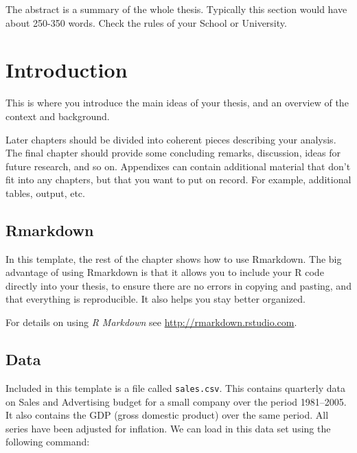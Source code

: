 \documentclass{sydneythesis}
\begin{document}
The abstract is a summary of the whole thesis. Typically this section would have about 250-350 words. Check the rules of your School or University.

\clearpage{}\setcounter{page}{0}

\hypertarget{ch:intro}{%
\chapter{Introduction}\label{ch:intro}}

This is where you introduce the main ideas of your thesis, and an overview of the context and background.

Later chapters should be divided into coherent pieces describing your analysis. The final chapter should provide some concluding remarks, discussion, ideas for future research, and so on. Appendixes can contain additional material that don't fit into any chapters, but that you want to put on record. For example, additional tables, output, etc.

\hypertarget{rmarkdown}{%
\section{Rmarkdown}\label{rmarkdown}}

In this template, the rest of the chapter shows how to use Rmarkdown. The big advantage of using Rmarkdown is that it allows you to include your R code directly into your thesis, to ensure there are no errors in copying and pasting, and that everything is reproducible. It also helps you stay better organized.

For details on using \emph{R Markdown} see \url{http://rmarkdown.rstudio.com}.

\hypertarget{data}{%
\section{Data}\label{data}}

Included in this template is a file called \texttt{sales.csv}. This contains quarterly data on Sales and Advertising budget for a small company over the period 1981--2005. It also contains the GDP (gross domestic product) over the same period. All series have been adjusted for inflation. We can load in this data set using the following command:

\begin{Shaded}
\begin{Highlighting}[]
\OtherTok{\textless{}{-}} \NormalTok{(}\NormalTok{(}\NormalTok{)[,}\SpecialCharTok{{-}}\NormalTok{], }\NormalTok{, }\NormalTok{)}
\end{Highlighting}
\end{Shaded}
\end{document}
